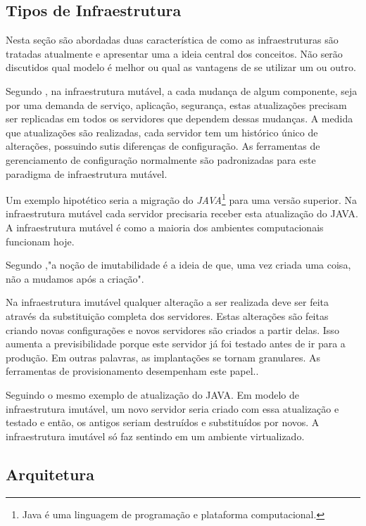  \subsection{Tipos de Infraestrutura}
 
 Nesta seção são abordadas duas característica de como as infraestruturas são tratadas atualmente e apresentar uma a ideia central dos conceitos. Não serão discutidos qual modelo é melhor ou qual as vantagens de se utilizar um ou outro. 

 Segundo , na infraestrutura mutável, a cada mudança de algum componente, seja por uma demanda de serviço, aplicação, segurança, estas atualizações precisam ser replicadas em todos os servidores que dependem dessas mudanças. A medida que atualizações são realizadas, cada servidor tem um histórico único de alterações, possuindo sutis diferenças de configuração. As ferramentas de gerenciamento de configuração normalmente são padronizadas para este paradigma de infraestrutura mutável. 
  
  Um exemplo hipotético seria a migração do \textit{JAVA}\footnote{Java é uma linguagem de programação e plataforma computacional.} para uma versão superior. Na infraestrutura mutável cada servidor precisaria receber esta atualização do JAVA. A infraestrutura mutável é como a maioria dos ambientes computacionais funcionam hoje.
 
 Segundo ,"a noção de imutabilidade é a ideia de que, uma vez criada uma coisa, não a mudamos após a criação".
 
 \hfill
 
 Na infraestrutura imutável qualquer alteração a ser realizada deve ser feita através da substituição completa dos servidores. Estas alterações são feitas criando novas configurações e novos servidores são criados a partir delas. Isso aumenta a previsibilidade porque este servidor já foi testado antes de ir para a produção. Em outras palavras, as implantações se tornam granulares. As ferramentas de provisionamento desempenham este papel.\cite{Morris:2016:ICM:3006361}.
 
  Seguindo o mesmo exemplo de atualização do JAVA. Em modelo de infraestrutura imutável, um novo servidor seria criado com essa atualização e testado e então, os antigos seriam destruídos e substituídos por novos. A infraestrutura imutável só faz sentindo em um ambiente virtualizado. 
 
\subsection{Arquitetura}

